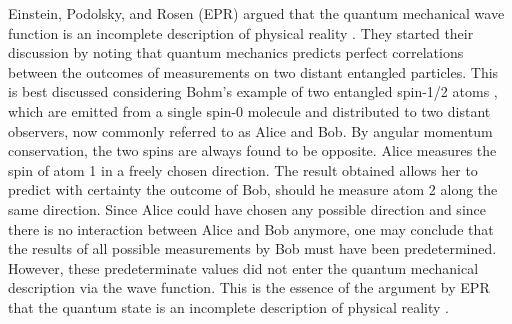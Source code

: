 \documentclass[superscriptaddress,twocolumn]{revtex4-1}
\begin{document}
Einstein, Podolsky, and Rosen (EPR) argued that the quantum mechanical wave function is an incomplete description of physical reality \cite{EPR1935}. They started their discussion by noting that quantum mechanics predicts perfect correlations between the outcomes of measurements on two distant entangled particles. This is best discussed considering Bohm's example of two entangled spin-1/2 atoms \cite{Bohm1951,Bohm1957}, which are emitted from a single spin-0 molecule and distributed to two distant observers, now commonly referred to as Alice and Bob. By angular momentum conservation, the two spins are always found to be opposite. Alice measures the spin of atom 1 in a freely chosen direction. The result obtained  allows her to predict with certainty the outcome of Bob, should he measure atom 2 along the same direction. Since Alice could have chosen any possible direction and since there is no interaction between Alice and Bob anymore, one may conclude that the results of all possible measurements by Bob must have been predetermined. However, these predeterminate values did not enter the quantum mechanical description via the wave function. This is the essence of the argument by EPR that the quantum state is an incomplete description of physical reality \cite{EPR1935}. 
\end{document}
